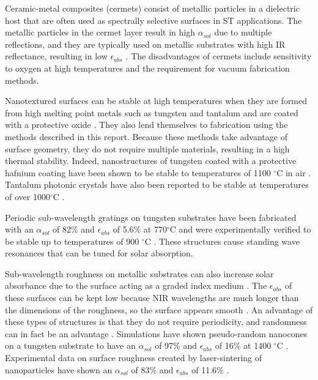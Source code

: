 \documentclass[10pt,letterpaper]{article}
\begin{document}
Ceramic-metal composites (cermets) consist of metallic particles in a dielectric host that are often used as spectrally selective surfaces in ST applications.  The metallic particles in the cermet layer result in high $\alpha_{sol}$ due to multiple reflections, and they are typically used on metallic substrates with high IR reflectance, resulting in low $\epsilon_{abs}$ \cite{A2,A4,A5,A6,A7,A8,A9,A10}.  The disadvantages of cermets include sensitivity to oxygen at high temperatures and the requirement for vacuum fabrication methods.

Nanotextured surfaces can be stable at high temperatures when they are 
formed from high melting point metals such as tungsten and tantalum and are coated with a protective oxide \cite{paper1_ref5}.  They also lend themselves to fabrication using the methods described in this report.  Because these methods take advantage of surface geometry, they do not require multiple materials, resulting in a high thermal stability.  Indeed, nanostructures of tungsten coated with a protective hafnium coating have been shown to be stable to temperatures of 1100 $^\circ$C in air \cite{paper1_ref5,Therm_stabil_W_microstructures}.  Tantalum photonic crystals have also been reported to be stable at temperatures of over 1000$^\circ$C \cite{photonic_crystal_rev}.

Periodic sub-wavelength gratings on tungsten substrates have been fabricated with an $\alpha_{sol}$ of 82\% and $\epsilon_{abs}$ of 5.6\% at 770$^\circ$C and were experimentally verified to be 
stable up to temperatures of 900 $^\circ$C \cite{A13}.  These structures cause standing wave resonances that can be tuned for solar absorption.

Sub-wavelength roughness on metallic substrates can also increase solar absorbance due to the surface acting as a graded index medium \cite{A13,A19}.  The $\epsilon_{abs}$ of these surfaces can be kept low because NIR wavelengths are much longer than the dimensions of the roughness, so the surface appears smooth \cite{A14}.  An advantage of these types of structures is that they do not require periodicity, and randomness can in fact be an advantage \cite{me1}.  Simulations have shown pseudo-random nanocones on a tungsten substrate to have an $\alpha_{sol}$ of 97\% and $\epsilon_{abs}$ of 16\% at 1400 $^\circ$C \cite{me1}.  Experimental data on surface roughness created by laser-sintering of nanoparticles have shown an $\alpha_{sol}$ of 83\% and $\epsilon_{abs}$ of 11.6\% \cite{g21}.
\end{document}
